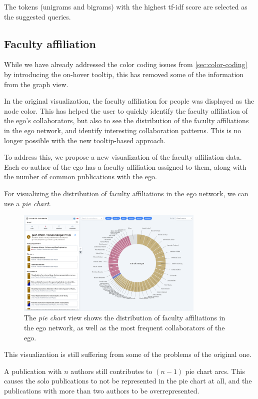 The tokens (unigrams and bigrams) with the highest tf-idf score are selected as the suggested queries.

\subsection{Faculty affiliation}

While we have already addressed the color coding issues from \ref{sec:color-coding} by introducing the on-hover tooltip, 
this has removed some of the information from the graph view.

In the original visualization, the faculty affiliation for people was displayed as the node color.
This has helped the user to quickly identify the faculty affiliation of the ego's collaborators, 
but also to see the distribution of the faculty affiliations in the ego network, 
and identify interesting collaboration patterns. 
This is no longer possible with the new tooltip-based approach.

To address this, we propose a new visualization of the faculty affiliation data.
Each co-author of the ego has a faculty affiliation assigned to them, along with the number of common publications with the ego.

For visualizing the distribution of faculty affiliations in the ego network, we can use a \textit{pie chart}.

\begin{figure}[ht!]
    \captionsetup{width=.9\linewidth}
    \includegraphics[width=0.8\textwidth]{../img/pie-chart.png}
    \centering
    \caption{The \textit{pie chart} view shows the distribution of faculty affiliations in the ego network, as well as the most frequent collaborators of the ego.}
\end{figure}

This visualization is still suffering from some of the problems of the original one. 

A publication with $n$ authors still contributes to $(n-1)$ pie chart arcs. 
This causes the solo publications to not be represented in the pie chart at all, and the publications with more than two authors to be overrepresented.

